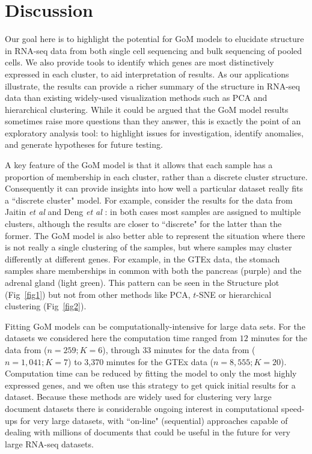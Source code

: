 \documentclass[10pt,letterpaper]{article}
\begin{document}

\section*{Discussion}

Our goal here is to highlight the potential for GoM models to elucidate structure in RNA-seq data from both single cell sequencing and bulk sequencing of pooled cells.
We also provide tools to identify which genes
are most distinctively expressed in each cluster, to aid interpretation of results.
As our applications illustrate, the results can provide a richer summary of the structure in RNA-seq data than existing widely-used visualization methods such as PCA and hierarchical clustering. While it could be argued that the GoM model results sometimes raise more questions than they answer, this is
exactly the point of an exploratory analysis tool: to highlight issues for investigation, identify anomalies, and generate hypotheses for future testing.

A key feature of the GoM
model is that it allows that each sample has a proportion of membership in each cluster, rather than a discrete cluster structure. Consequently
it can provide insights into how well a
particular dataset really fits a ``discrete cluster" model. For example, consider the results for the data from Jaitin \textit{et al} \cite{Jaitin2014} and Deng \textit{et al} \cite{Deng2014}:
in both cases most samples are assigned to multiple clusters, although the results are closer to ``discrete" for the latter than the former.
The GoM model is also better able to represent the situation where there is not really a single clustering of the samples,
but where samples may cluster differently at different genes. For example, in the GTEx data, the stomach samples share memberships in common with
both the pancreas (purple) and the adrenal gland (light green). This pattern can be seen in the Structure plot (Fig~\ref{fig1}) but not from other methods like PCA, $t$-SNE or hierarchical clustering (Fig~\ref{fig2}).

Fitting GoM models can be computationally-intensive for large data sets. For the datasets we considered here the computation time ranged from $12$ minutes for the data from \cite{Deng2014} ($n=259; K=6$), through $33$ minutes for the
data from \cite{Jaitin2014} ($n=1,041; K=7$) to 3,370 minutes for the GTEx data ($n=8,555; K=20$).
Computation time can be reduced by fitting the model to only the most highly expressed genes, and we often use this strategy to get quick initial results for a dataset.
Because these methods are widely used for clustering very large document datasets there is considerable ongoing interest in
computational speed-ups for very large datasets, with ``on-line" (sequential) approaches capable of dealing with millions of documents  \cite{Hoffman2010} that could be useful in the future for very large RNA-seq datasets.
\end{document}
